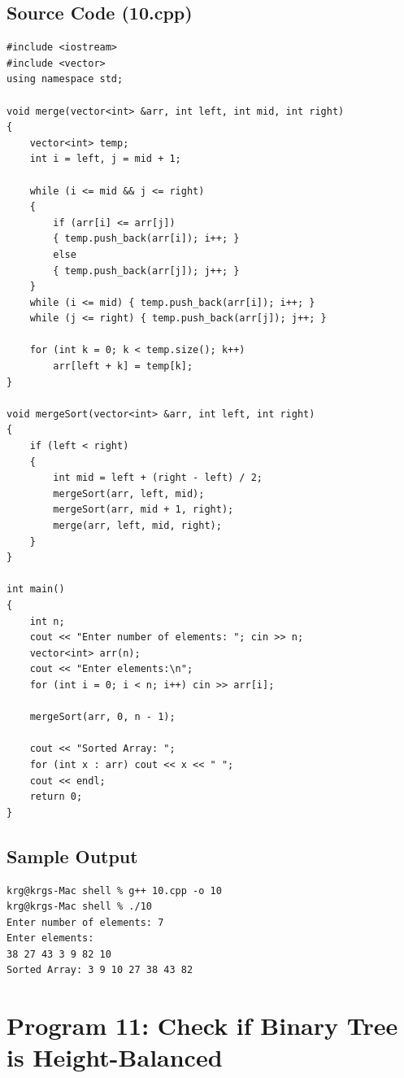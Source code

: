 \documentclass[a4paper,12pt]{article}
\begin{document}
\subsection*{Source Code (10.cpp)}
\begin{lstlisting}[style=cppstyle]
#include <iostream>
#include <vector>
using namespace std;

void merge(vector<int> &arr, int left, int mid, int right)
{
    vector<int> temp;
    int i = left, j = mid + 1;

    while (i <= mid && j <= right)
    {
        if (arr[i] <= arr[j])
        { temp.push_back(arr[i]); i++; }
        else
        { temp.push_back(arr[j]); j++; }
    }
    while (i <= mid) { temp.push_back(arr[i]); i++; }
    while (j <= right) { temp.push_back(arr[j]); j++; }

    for (int k = 0; k < temp.size(); k++)
        arr[left + k] = temp[k];
}

void mergeSort(vector<int> &arr, int left, int right)
{
    if (left < right)
    {
        int mid = left + (right - left) / 2;
        mergeSort(arr, left, mid);
        mergeSort(arr, mid + 1, right);
        merge(arr, left, mid, right);
    }
}

int main()
{
    int n;
    cout << "Enter number of elements: "; cin >> n;
    vector<int> arr(n);
    cout << "Enter elements:\n";
    for (int i = 0; i < n; i++) cin >> arr[i];

    mergeSort(arr, 0, n - 1);

    cout << "Sorted Array: ";
    for (int x : arr) cout << x << " ";
    cout << endl;
    return 0;
}
\end{lstlisting}

\subsection*{Sample Output}
\begin{lstlisting}[style=outputstyle]
krg@krgs-Mac shell % g++ 10.cpp -o 10
krg@krgs-Mac shell % ./10
Enter number of elements: 7
Enter elements:
38 27 43 3 9 82 10
Sorted Array: 3 9 10 27 38 43 82
\end{lstlisting}

\newpage

\section*{Program 11: Check if Binary Tree is Height-Balanced}
\end{document}

